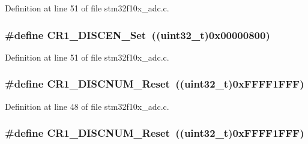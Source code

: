 Definition at line 51 of file stm32f10x\+\_\+adc.\+c.

\subsubsection[{\texorpdfstring{C\+R1\+\_\+\+D\+I\+S\+C\+E\+N\+\_\+\+Set}{CR1_DISCEN_Set}}]{\setlength{\rightskip}{0pt plus 5cm}\#define C\+R1\+\_\+\+D\+I\+S\+C\+E\+N\+\_\+\+Set~(({\bf uint32\+\_\+t})0x00000800)}\hypertarget{group___a_d_c___private___defines_ga95f4f653adde3407c116919c2b7d9c74}{}\label{group___a_d_c___private___defines_ga95f4f653adde3407c116919c2b7d9c74}


Definition at line 51 of file stm32f10x\+\_\+adc.\+c.

\subsubsection[{\texorpdfstring{C\+R1\+\_\+\+D\+I\+S\+C\+N\+U\+M\+\_\+\+Reset}{CR1_DISCNUM_Reset}}]{\setlength{\rightskip}{0pt plus 5cm}\#define C\+R1\+\_\+\+D\+I\+S\+C\+N\+U\+M\+\_\+\+Reset~(({\bf uint32\+\_\+t})0x\+F\+F\+F\+F1\+F\+F\+F)}\hypertarget{group___a_d_c___private___defines_ga88cecf0c336d950115d7a52d599de816}{}\label{group___a_d_c___private___defines_ga88cecf0c336d950115d7a52d599de816}


Definition at line 48 of file stm32f10x\+\_\+adc.\+c.

\subsubsection[{\texorpdfstring{C\+R1\+\_\+\+D\+I\+S\+C\+N\+U\+M\+\_\+\+Reset}{CR1_DISCNUM_Reset}}]{\setlength{\rightskip}{0pt plus 5cm}\#define C\+R1\+\_\+\+D\+I\+S\+C\+N\+U\+M\+\_\+\+Reset~(({\bf uint32\+\_\+t})0x\+F\+F\+F\+F1\+F\+F\+F)}\hypertarget{group___a_d_c___private___defines_ga88cecf0c336d950115d7a52d599de816}{}\label{group___a_d_c___private___defines_ga88cecf0c336d950115d7a52d599de816}


